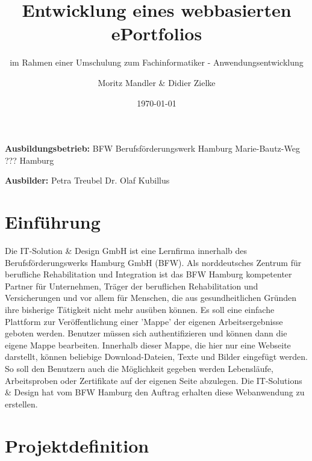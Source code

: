 \documentclass[10pt]{scrarticle}
\title{Entwicklung eines webbasierten ePortfolios}
\subtitle{im Rahmen einer Umschulung zum Fachinformatiker - Anwendungsentwicklung}
\author{Moritz Mandler \& Didier Zielke}
\date{\today}
\begin{document}
\lstset{frameround=fttt,numbers=left,breaklines=true, xleftmargin=0.5cm, basicstyle=\footnotesize\ttfamily}

\maketitle


\vspace{\fill}
\textbf{Ausbildungsbetrieb:}\newline
BFW Berufsförderungswerk Hamburg \newline
Marie-Bautz-Weg ???  Hamburg

\textbf{Ausbilder:}\newline
Petra Treubel \newline
Dr. Olaf Kubillus

\newpage

\tableofcontents

\newpage

\section{Einführung}

Die IT-Solution \& Design GmbH ist eine Lernfirma innerhalb des Berufsförderungswerks Hamburg GmbH (BFW). Als norddeutsches Zentrum für berufliche Rehabilitation und Integration ist das BFW Hamburg kompetenter Partner für Unternehmen, Träger der beruflichen Rehabilitation und Versicherungen und vor allem für Menschen, die aus gesundheitlichen Gründen ihre bisherige Tätigkeit nicht mehr ausüben können.  
Es soll eine einfache Plattform zur Veröffentlichung einer 'Mappe' der eigenen Arbeitsergebnisse geboten werden. Benutzer müssen sich authentifizieren und können dann die eigene Mappe bearbeiten. Innerhalb dieser Mappe, die hier nur eine Webseite darstellt, können beliebige Download-Dateien, Texte und Bilder eingefügt werden. So soll den Benutzern auch die Möglichkeit gegeben werden Lebensläufe, Arbeitsproben oder Zertifikate auf der eigenen Seite abzulegen.
Die IT-Solutions \& Design hat vom BFW Hamburg den Auftrag erhalten diese Webanwendung zu erstellen. 

\section{Projektdefinition}
\end{document}
